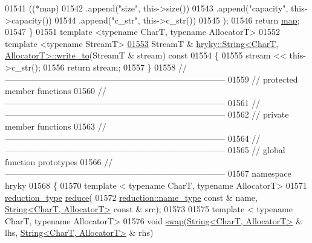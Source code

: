 \begin{DoxyCode}
01541     ((*map)
01542      .append(\textcolor{stringliteral}{"size"},        this->size())
01543      .append(\textcolor{stringliteral}{"capacity"},    this->capacity())
01544      .append(\textcolor{stringliteral}{"c\_str"},       this->c\_str())
01545      );
01546     \textcolor{keywordflow}{return} \hyperlink{namespacehryky_1_1reduction_ac5eae270cf8047b294dc4ff3e5e11a79}{map};
01547 \}
01551 \textcolor{keyword}{template} <\textcolor{keyword}{typename} CharT, \textcolor{keyword}{typename} AllocatorT>
01552 \textcolor{keyword}{template} <\textcolor{keyword}{typename} StreamT>
\hypertarget{string_8h_source_l01553}{}\hyperlink{classhryky_1_1_string_a5632cb3b6a55de35a0d2c03ddbe8f75e}{01553} StreamT & \hyperlink{classhryky_1_1_string}{hryky::String<CharT, AllocatorT>::write_to}(StreamT & stream)\textcolor{keyword}{ const}
01554 \textcolor{keyword}{}\{
01555     stream << this->c\_str();
01556     \textcolor{keywordflow}{return} stream;
01557 \}
01558 \textcolor{comment}{//
      ------------------------------------------------------------------------------}
01559 \textcolor{comment}{// protected member functions}
01560 \textcolor{comment}{//
      ------------------------------------------------------------------------------}
01561 \textcolor{comment}{//
      ------------------------------------------------------------------------------}
01562 \textcolor{comment}{// private member functions}
01563 \textcolor{comment}{//
      ------------------------------------------------------------------------------}
01564 \textcolor{comment}{//
      ------------------------------------------------------------------------------}
01565 \textcolor{comment}{// global function prototypes}
01566 \textcolor{comment}{//
      ------------------------------------------------------------------------------}
01567 \textcolor{keyword}{namespace }hryky
01568 \{
01570     \textcolor{keyword}{template} < \textcolor{keyword}{typename} CharT, \textcolor{keyword}{typename} AllocatorT>
01571     \hyperlink{classhryky_1_1_intrusive_ptr}{reduction_type} \hyperlink{namespacehryky_af41cb3af6766761da0ff21b84527a52c}{reduce}(
01572         \hyperlink{classhryky_1_1reduction_1_1_string}{reduction::name_type} \textcolor{keyword}{const} & name, \hyperlink{classhryky_1_1_string}{String<CharT, AllocatorT>} \textcolor{keyword}{const} & 
      src);
01573 
01575     \textcolor{keyword}{template} < \textcolor{keyword}{typename} CharT, \textcolor{keyword}{typename} AllocatorT>
01576     \textcolor{keywordtype}{void} \hyperlink{namespacehryky_a4282146df5ea2b68cb667896a2205909}{swap}(\hyperlink{classhryky_1_1_string}{String<CharT, AllocatorT>} & lhs, \hyperlink{classhryky_1_1_string}{String<CharT, AllocatorT>} & rhs)

\end{DoxyCode}
